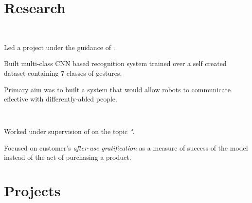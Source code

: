 \documentclass[]{deedy-resume-openfont}
\begin{document}
\hfill
\begin{minipage}[t]{0.66\textwidth} 




\section{Research}
\href{http://robita.iiita.ac.in/}{}\\
\vspace{\topsep} %
\begin{tightemize}
\item Led a project under the guidance of  .
\item Built multi-class CNN based recognition system trained over a self created dataset containing 7 classes of gestures.
\item Primary aim was to built a system that would allow robots to communicate effective with differently-abled people.
\end{tightemize}
\sectionsep

{}\\
\begin{tightemize}
\item 
Worked under supervision of  on the topic \textit{"}.
\item Focused on customer's \textit{after-use gratification} as a measure of success of the model instead of the act of purchasing a product.
\end{tightemize}
\sectionsep


\section{Projects}



\end{minipage}
\end{document}
